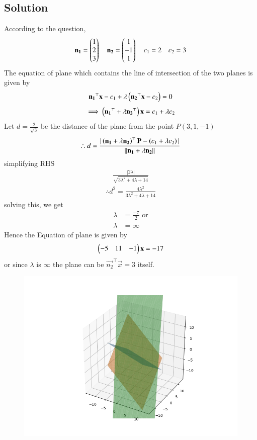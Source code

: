 \documentclass[journal]{IEEEtran}
\begin{document}
\subsection*{\textbf{Solution}}
According to the question,\\
\begin{align}
    \mathbf{n_1}=\begin{pmatrix}1\\2\\3\end{pmatrix} \quad \mathbf{n_2}=\begin{pmatrix}1\\-1\\1\end{pmatrix} \quad c_1=2 \quad c_2=3
\end{align}
The equation of plane which contains the line of intersection of the two planes is given by
\begin{align}
    \mathbf{n_1}^{\top}\mathbf{x}-c_1+\lambda\left(\mathbf{n_2}^{\top}\mathbf{x}-c_2\right)=0
\end{align}
\begin{align}
    \implies \left(\mathbf{n_1}^{\top}+\lambda\mathbf{n_2}^{\top}\right)\mathbf{x}=c_1+\lambda c_2
\end{align}
Let $d = \frac{2}{\sqrt{3}}$ be the distance of the plane from the point $P(3,1,-1)$ 
\begin{align}
    \therefore d = \frac{|\left(\mathbf{n_1}+\lambda\mathbf{n_2}\right)^{\top}\mathbf{P} - \left(c_1+\lambda c_2\right)|}{||\mathbf{n_1}+\lambda \mathbf{n_2}||}
\end{align}
simplifying RHS
\begin{align}
    \frac{|2\lambda|}{\sqrt{3\lambda ^2 +4\lambda +14}}
\end{align}
\begin{align}
    \therefore d^2= \frac{4\lambda ^2}{3\lambda ^2 +4\lambda +14}
\end{align}
solving this, we get
\begin{align}
   \lambda &=\frac{-7}{2} \text{ or}\\
   \lambda &= \infty
\end{align}
Hence the Equation of plane is given by
\begin{align}
    \begin{pmatrix}-5&11&-1\end{pmatrix}\mathbf{x}=-17
\end{align}
or since $\lambda$ is $\infty$ the plane can be $\vec{n_2}^{\top} \vec{x} = 3 $ itself.
\newpage 
\begin{figure}[H]
    \centering
    \includegraphics[width=0.8\columnwidth]{figs/fig.png}
    \label{fig:1}
\end{figure}
\end{document}
